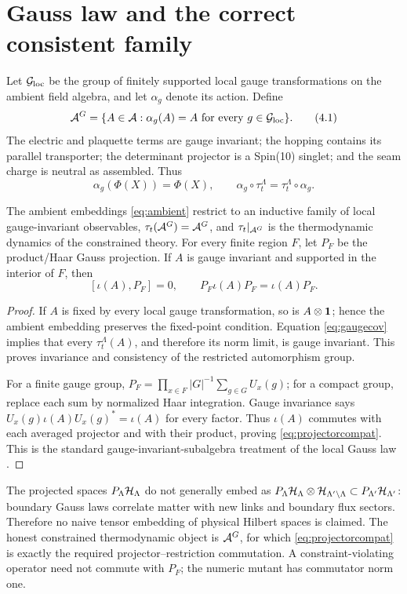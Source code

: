 \section{Gauss law and the correct consistent family}

Let \(\mathcal G_{\rm loc}\) be the group of finitely supported local gauge
transformations on the ambient field algebra, and let \(\alpha_g\) denote
its action.  Define
\[
 \mathcal A^G=\{A\in\mathcal A:\alpha_g(A)=A\text{ for every }g\in\mathcal G_{\rm loc}\}.
\tag{4.1}\label{eq:fixed}
\]
The electric and plaquette terms are gauge invariant; the hopping contains
its parallel transporter; the determinant projector is a Spin(10) singlet;
and the seam charge is neutral as assembled.  Thus
\[
 \alpha_g(\Phi(X))=\Phi(X),\qquad
 \alpha_g\circ\tau_t^\Lambda=\tau_t^\Lambda\circ\alpha_g.
\tag{4.2}\label{eq:gaugecov}
\]

\begin{proposition}
\label{prop:gauss}
The ambient embeddings \eqref{eq:ambient} restrict to an inductive family
of local gauge-invariant observables, \(\tau_t(\mathcal A^G)=\mathcal A^G\), and
\(\tau_t|_{\mathcal A^G}\) is the thermodynamic dynamics of the constrained theory.
For every finite region \(F\), let \(P_F\) be the product/Haar Gauss
projection.  If \(A\) is gauge invariant and supported in the interior of
\(F\), then
\[
 [\iota(A),P_F]=0,\qquad
 P_F\iota(A)P_F=\iota(A)P_F.
\tag{4.3}\label{eq:projectorcompat}
\]
\end{proposition}

\begin{proof}
If \(A\) is fixed by every local gauge transformation, so is
\(A\otimes\mathbf 1\); hence the ambient embedding preserves the fixed-point
condition.  Equation \eqref{eq:gaugecov} implies that every
\(\tau_t^\Lambda(A)\), and therefore its norm limit, is gauge invariant.
This proves invariance and consistency of the restricted automorphism
group.

For a finite gauge group,
\(P_F=\prod_{x\in F}|G|^{-1}\sum_{g\in G}U_x(g)\); for a compact group,
replace each sum by normalized Haar integration.  Gauge invariance says
\(U_x(g)\iota(A)U_x(g)^*=\iota(A)\) for every factor.  Thus \(\iota(A)\)
commutes with each averaged projector and with their product, proving
\eqref{eq:projectorcompat}.  This is the standard
gauge-invariant-subalgebra treatment of the local Gauss law
\cite{GrundlingLledo,GrundlingRudolph}.
\end{proof}

\begin{remark}
The projected spaces \(P_\Lambda\mathcal H_\Lambda\) do not generally embed as
\(P_\Lambda\mathcal H_\Lambda\otimes\mathcal H_{\Lambda'\setminus\Lambda}\subset
P_{\Lambda'}\mathcal H_{\Lambda'}\): boundary Gauss laws correlate matter with
new links and boundary flux sectors.  Therefore no naive tensor embedding
of physical Hilbert spaces is claimed.  The honest constrained
thermodynamic object is \(\mathcal A^G\), for which
\eqref{eq:projectorcompat} is exactly the required projector--restriction
commutation.  A constraint-violating operator need not commute with
\(P_F\); the numeric mutant has commutator norm one.
\end{remark}

